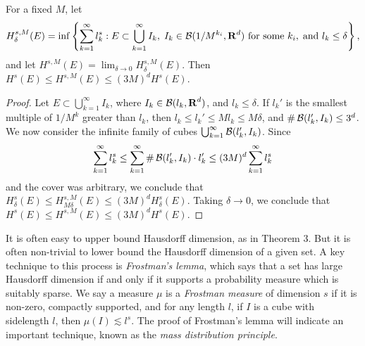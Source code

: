 \begin{lemma}
	For a fixed $M$, let
	\[ H^{s,M}_\delta(E) = \inf \left\{ \sum_{k = 1}^\infty l_k^s : E \subset \bigcup_{k = 1}^\infty I_k,\; I_k \in \operatorname{\mathcal{B}}(1/M^{k_i},\operatorname{\mathbf{R}}^d)\ \text{for some $k_i$}, \; \text{and}\ l_k \leq \delta \right\}, \]
	and let $H^{s,M}(E) = \lim_{\delta \to 0} H^{s,M}_\delta(E)$. Then $H^s(E) \leq H^{s,M}(E) \leq (3M)^d H^s(E)$.
\end{lemma}
\begin{proof}
	Let $E \subset \bigcup_{k = 1}^\infty I_k$, where $I_k \in \operatorname{\mathcal{B}}(l_k,\operatorname{\mathbf{R}}^d)$, and $l_k \leq \delta$. If $l_k'$ is the smallest multiple of $1/M^k$ greater than $l_k$, then $l_k \leq l_k' \leq M l_k \leq M\delta$, and $\# \operatorname{\mathcal{B}}(l_k',I_k) \leq 3^d$. We now consider the infinite family of cubes $\bigcup_{k = 1}^\infty \operatorname{\mathcal{B}}(l_k', I_k)$. Since
	\[ \sum_{k = 1}^\infty l_k^s \leq \sum_{k = 1}^\infty \# \operatorname{\mathcal{B}}(l_k', I_k) \cdot l_k' \leq (3M)^d \sum_{k = 1}^\infty l_k^s \]
	and the cover was arbitrary, we conclude that $H^s_\delta(E) \leq H^{s,M}_{M\delta}(E) \leq (3M)^d H^s_\delta(E)$. Taking $\delta \to 0$, we conclude that $H^s(E) \leq H^{s,M}(E) \leq (3M)^d H^s(E)$.
\end{proof}

It is often easy to upper bound Hausdorff dimension, as in Theorem 3. But it is often non-trivial to lower bound the Hausdorff dimension of a given set. A key technique to this process is \emph{Frostman's lemma}, which says that a set has large Hausdorff dimension if and only if it supports a probability measure which is suitably sparse. We say a measure $\mu$ is a \emph{Frostman measure} of dimension $s$ if it is non-zero, compactly supported, and for any length $l$, if $I$ is a cube with sidelength $l$, then $\mu(I) \lesssim l^s$. The proof of Frostman's lemma will indicate an important technique, known as the \emph{mass distribution principle}.

